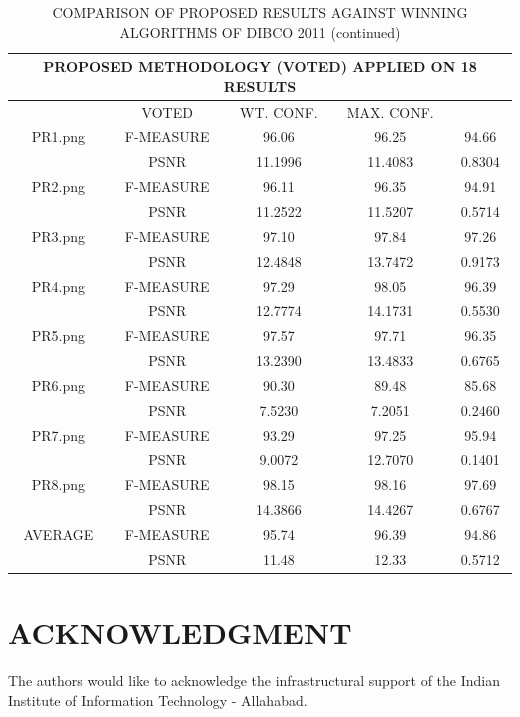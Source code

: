 \documentclass[conference]{IEEEtran}
\begin{document}
\begin{table}[!t]
\caption{COMPARISON OF PROPOSED RESULTS AGAINST WINNING ALGORITHMS OF DIBCO 2011 (continued)}
\centering
\footnotesize
\begin{tabular}{|c|c|c|c|c|}
\hline
\multicolumn{5}{|c|}{PROPOSED METHODOLOGY (VOTED) APPLIED ON 18 RESULTS} \\
\hline
 & VOTED & WT. CONF. & MAX. CONF. & \\
\hline
PR1.png & F-MEASURE & 96.06 & 96.25 & 94.66 \\
 & PSNR & 11.1996 & 11.4083 & 0.8304 \\
\hline
PR2.png & F-MEASURE & 96.11 & 96.35 & 94.91 \\
 & PSNR & 11.2522 & 11.5207 & 0.5714 \\
\hline
PR3.png & F-MEASURE & 97.10 & 97.84 & 97.26 \\
 & PSNR & 12.4848 & 13.7472 & 0.9173 \\
\hline
PR4.png & F-MEASURE & 97.29 & 98.05 & 96.39 \\
 & PSNR & 12.7774 & 14.1731 & 0.5530 \\
\hline
PR5.png & F-MEASURE & 97.57 & 97.71 & 96.35 \\
 & PSNR & 13.2390 & 13.4833 & 0.6765 \\
\hline
PR6.png & F-MEASURE & 90.30 & 89.48 & 85.68 \\
 & PSNR & 7.5230 & 7.2051 & 0.2460 \\
\hline
PR7.png & F-MEASURE & 93.29 & 97.25 & 95.94 \\
 & PSNR & 9.0072 & 12.7070 & 0.1401 \\
\hline
PR8.png & F-MEASURE & 98.15 & 98.16 & 97.69 \\
 & PSNR & 14.3866 & 14.4267 & 0.6767 \\
\hline
AVERAGE & F-MEASURE & 95.74 & 96.39 & 94.86 \\
 & PSNR & 11.48 & 12.33 & 0.5712 \\
\hline
\end{tabular}
\label{tab:voted_on18}
\end{table}

\section*{ACKNOWLEDGMENT}
The authors would like to acknowledge the infrastructural support of the Indian Institute of Information Technology - Allahabad.
\end{document}
